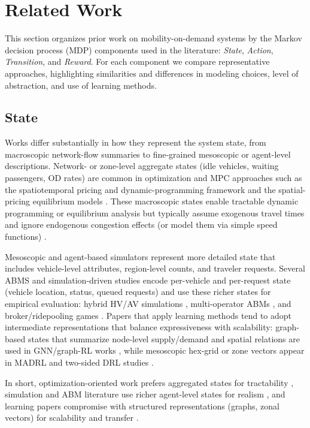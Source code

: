 \section{Related Work}
This section organizes prior work on mobility-on-demand systems by the Markov decision process (MDP) components used in the literature: \textit{State}, \textit{Action}, \textit{Transition}, and \textit{Reward}. For each component we compare representative approaches, highlighting similarities and differences in modeling choices, level of abstraction, and use of learning methods.

\subsection{State}
Works differ substantially in how they represent the system state, from macroscopic network-flow summaries to fine-grained mesoscopic or agent-level descriptions. Network- or zone-level aggregate states (idle vehicles, waiting passengers, OD rates) are common in optimization and MPC approaches such as the spatiotemporal pricing and dynamic-programming framework \citep{spatiotemporal_pricing} and the spatial-pricing equilibrium models \citep{spatial_pricing,geometric_matching}. These macroscopic states enable tractable dynamic programming or equilibrium analysis but typically assume exogenous travel times and ignore endogenous congestion effects (or model them via simple speed functions) \citep{spatial_pricing,spatiotemporal_pricing}.

Mesoscopic and agent-based simulators represent more detailed state that includes vehicle-level attributes, region-level counts, and traveler requests. Several ABMS and simulation-driven studies encode per-vehicle and per-request state (vehicle location, status, queued requests) and use these richer states for empirical evaluation: hybrid HV/AV simulations \citep{hybrid_operations}, multi-operator ABMs \citep{modeling_the_competition}, and broker/ridepooling games \citep{competition_and_cooperation}. Papers that apply learning methods tend to adopt intermediate representations that balance expressiveness with scalability: graph-based states that summarize node-level supply/demand and spatial relations are used in GNN/graph-RL works \citep{graph_meta,learning_based}, while mesoscopic hex-grid or zone vectors appear in MADRL and two-sided DRL studies \citep{competitive_pricing,two_sided}.

In short, optimization-oriented work prefers aggregated states for tractability \citep{spatiotemporal_pricing,geometric_matching,spatial_pricing}, simulation and ABM literature use richer agent-level states for realism \citep{hybrid_operations,modeling_the_competition,competition_and_cooperation}, and learning papers compromise with structured representations (graphs, zonal vectors) for scalability and transfer \citep{graph_meta,learning_based,competitive_pricing,two_sided}.

